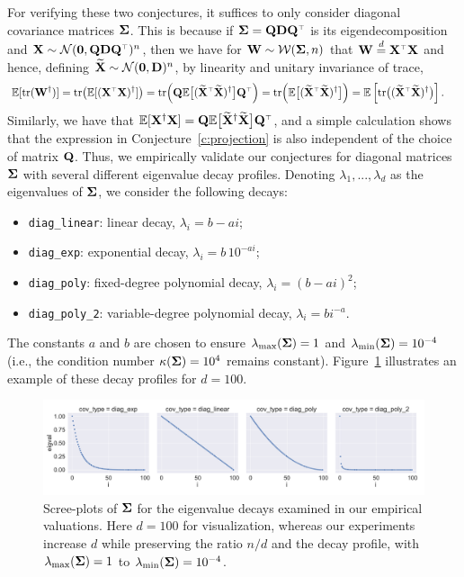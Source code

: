 For verifying these two conjectures, it suffices to only consider
diagonal covariance matrices $\mathbf{\Sigma}$.  This is because if $\Sigmab = \Q \D
\Q^\top$ is its eigendecomposition and $\X\sim\Nc(\zero, \Q\D\Q^\top)^n$, then
we have for $\mathbf W \sim \mathcal{W}(\mathbf{\Sigma}, n)$ that $\W
\overset{d}{=} \X^\top \X$ and hence, defining
$\widetilde{\mathbf{X}}\sim\mathcal{N}(\mathbf 0,\mathbf D)^n$, by linearity and unitary invariance of trace,
\begin{align*}
  \E[\tr(\W^\dagger)]
  &= \tr\big( \E[(\X^\top\X)^\dagger] \big)
  = \tr\Big( \Q\E\big[(\Xt^\top\Xt)^\dagger\big]\Q^\top \Big)
  = \tr\Big( \E\big[(\Xt^\top\Xt)^\dagger\big] \Big)
  = \E\left[\tr \big((\Xt^\top\Xt)^\dagger\big) \right].
\end{align*}
Similarly, we have that
$\E[\X^\dagger\X]=\Q\E\big[\Xt^\dagger\Xt\big]\Q^\top$, and a simple
calculation shows that the expression in Conjecture~\ref{c:projection}
is also independent of the choice of matrix $\mathbf Q$.
Thus, we empirically validate our conjectures for diagonal matrices $\mathbf{\Sigma}$
with several different eigenvalue decay profiles. Denoting
$\lambda_1,...,\lambda_d$ as the eigenvalues of $\mathbf{\Sigma}$, we consider
the following decays:
\begin{itemize}
  \item \texttt{diag\_linear}: linear decay, $\lambda_{i} = b-a i$;
  \item \texttt{diag\_exp}: exponential decay, $\lambda_{i} = b\,10^{-
      a i} $;
  \item \texttt{diag\_poly}: fixed-degree polynomial decay, $\lambda_{i} = (b-a i)^2$;
  \item \texttt{diag\_poly\_2}: variable-degree polynomial decay, $\lambda_i = b i^{-a}$.
\end{itemize}
The constants $a$ and $b$ are chosen to ensure $\lambda_{\text{max}}(\mathbf{\Sigma}) = 1$ and
$\lambda_{\text{min}}(\mathbf{\Sigma}) = 10^{-4}$ (i.e., the condition number
$\kappa(\mathbf{\Sigma}) = 10^{4}$ remains constant).
Figure~\ref{fig:eig-decays} illustrates an example of these decay profiles
for $d=100$.

\begin{figure}[H]
    \includegraphics[width=\textwidth]{continuous_figures/decays.pdf}
  \caption{Scree-plots of $\mathbf{\Sigma}$ for the eigenvalue decays examined
    in our empirical valuations. Here $d=100$ for visualization, whereas
    our experiments increase $d$ while preserving the ratio $n/d$ and
    the decay profile,
    with $\lambda_{\text{max}}(\mathbf{\Sigma}) = 1$ to
    $\lambda_{\text{min}}(\mathbf{\Sigma}) = 10^{-4}$.}
  \label{fig:eig-decays}
\end{figure}



